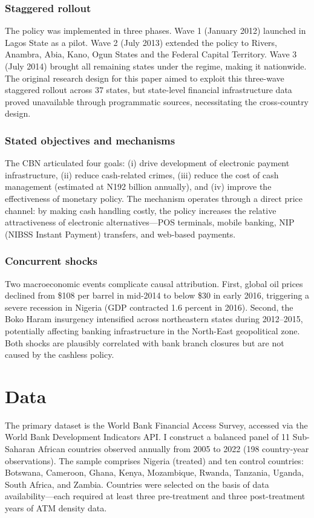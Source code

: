 \documentclass[12pt]{article}
\begin{document}
\subsubsection*{Staggered rollout} The policy was implemented in three phases. Wave 1 (January 2012) launched in Lagos State as a pilot. Wave 2 (July 2013) extended the policy to Rivers, Anambra, Abia, Kano, Ogun States and the Federal Capital Territory. Wave 3 (July 2014) brought all remaining states under the regime, making it nationwide. The original research design for this paper aimed to exploit this three-wave staggered rollout across 37 states, but state-level financial infrastructure data proved unavailable through programmatic sources, necessitating the cross-country design.

\subsubsection*{Stated objectives and mechanisms} The CBN articulated four goals: (i) drive development of electronic payment infrastructure, (ii) reduce cash-related crimes, (iii) reduce the cost of cash management (estimated at \textnormal{N}192 billion annually), and (iv) improve the effectiveness of monetary policy. The mechanism operates through a direct price channel: by making cash handling costly, the policy increases the relative attractiveness of electronic alternatives---POS terminals, mobile banking, NIP (NIBSS Instant Payment) transfers, and web-based payments.

\subsubsection*{Concurrent shocks} Two macroeconomic events complicate causal attribution. First, global oil prices declined from \$108 per barrel in mid-2014 to below \$30 in early 2016, triggering a severe recession in Nigeria (GDP contracted 1.6 percent in 2016). Second, the Boko Haram insurgency intensified across northeastern states during 2012--2015, potentially affecting banking infrastructure in the North-East geopolitical zone. Both shocks are plausibly correlated with bank branch closures but are not caused by the cashless policy.

\section{Data}

The primary dataset is the World Bank Financial Access Survey, accessed via the World Bank Development Indicators API. I construct a balanced panel of 11 Sub-Saharan African countries observed annually from 2005 to 2022 (198 country-year observations). The sample comprises Nigeria (treated) and ten control countries: Botswana, Cameroon, Ghana, Kenya, Mozambique, Rwanda, Tanzania, Uganda, South Africa, and Zambia. Countries were selected on the basis of data availability---each required at least three pre-treatment and three post-treatment years of ATM density data.
\end{document}

